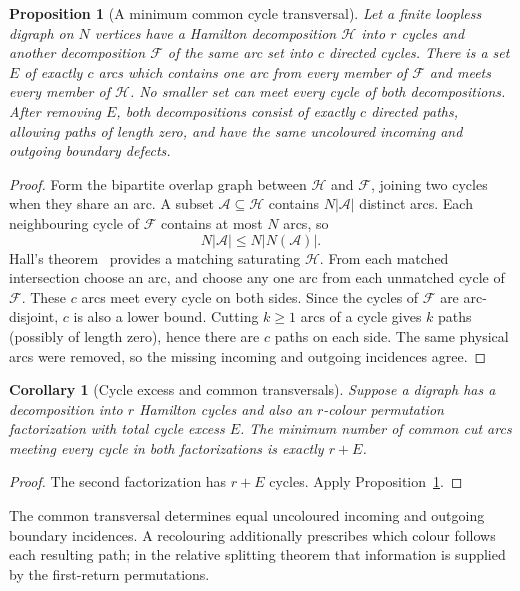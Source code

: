 \documentclass[11pt,reqno]{amsart}
\numberwithin{equation}{section}
\newtheorem{proposition}[theorem]{Proposition}
\newtheorem{corollary}[theorem]{Corollary}
\theoremstyle{definition}
\theoremstyle{remark}
\begin{document}
\begin{proposition}[A minimum common cycle transversal]\label{prop:common-cuts}
Let a finite loopless digraph on $N$ vertices have a Hamilton decomposition
$\mathcal H$ into $r$ cycles and another decomposition $\mathcal F$ of the
same arc set into $c$ directed cycles. There is a set $E$ of exactly $c$
arcs which contains one arc from every member of $\mathcal F$ and meets
every member of $\mathcal H$. No smaller set can meet every cycle of
both decompositions.
After removing $E$, both decompositions consist of exactly $c$ directed
paths, allowing paths of length zero, and have the same uncoloured
incoming and outgoing boundary defects.
\end{proposition}
\begin{proof}
Form the bipartite overlap graph between $\mathcal H$ and $\mathcal F$,
joining two cycles when they share an arc. A subset $\mathcal A\subseteq
\mathcal H$ contains $N|\mathcal A|$ distinct arcs. Each neighbouring
cycle of $\mathcal F$ contains at most $N$ arcs, so
\[
 N|\mathcal A|\le N|N(\mathcal A)|.
\]
Hall's theorem~\cite{Hall35} provides a matching saturating $\mathcal H$.
From each matched intersection choose an arc, and choose any one arc
from each unmatched cycle of $\mathcal F$. These $c$ arcs meet every
cycle on both sides. Since the cycles of $\mathcal F$ are arc-disjoint,
$c$ is also a lower bound.
Cutting $k\ge1$ arcs of a cycle gives $k$ paths (possibly of length zero),
hence there are $c$
paths on each side. The same physical arcs were removed, so the missing
incoming and outgoing incidences agree.
\end{proof}

\begin{corollary}[Cycle excess and common transversals]\label{cor:excess-cuts}
Suppose a digraph has a decomposition into $r$ Hamilton cycles and also
an $r$-colour permutation factorization with total cycle excess $E$.
The minimum number of common cut arcs meeting every cycle in both
factorizations is exactly $r+E$.
\end{corollary}
\begin{proof}
The second factorization has $r+E$ cycles. Apply
Proposition~\ref{prop:common-cuts}.
\end{proof}

The common transversal determines equal uncoloured incoming and
outgoing boundary incidences. A recolouring additionally prescribes
which colour follows each resulting path; in the relative splitting
theorem that information is supplied by the first-return permutations.
\end{document}
